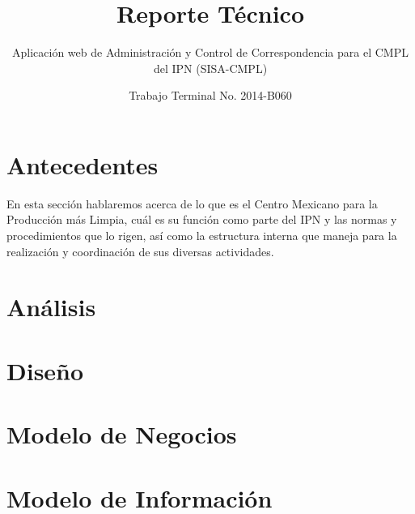 \documentclass[oneside,10pt]{book}
\title{Reporte Técnico}
\subtitle{Aplicación web de Administración y Control de Correspondencia para el CMPL del IPN (SISA-CMPL)}
\author{Trabajo Terminal No. 2014-B060}
\begin{document}
\maketitle
\thispagestyle{empty}

\frontmatter
\tableofcontents

\mainmatter

\chapter{Antecedentes}
	En esta sección hablaremos acerca de lo que es el Centro Mexicano para la Producción más Limpia, cuál es su función como parte del IPN y las normas y procedimientos que lo rigen, así como la estructura interna que maneja para la realización y coordinación de sus diversas actividades.
	


\chapter{Análisis}


\chapter{Diseño}



\chapter{Modelo de Negocios}




\chapter{Modelo de Información}


	
\end{document}
